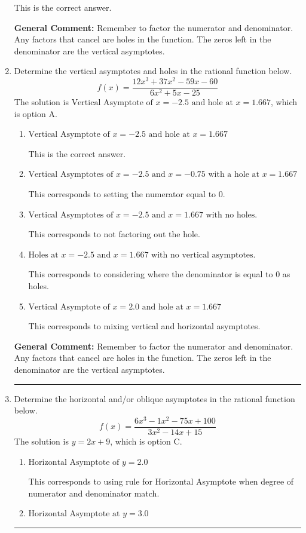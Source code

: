 \documentclass{extbook}[14pt]
\newcommand{\litem}[1]{\item #1

\rule{\textwidth}{0.4pt}}
\begin{document}
\begin{enumerate}
{\begin{enumerate}[label=\Alph*.]
This is the correct answer.
\end{enumerate}

\textbf{General Comment:} Remember to factor the numerator and denominator. Any factors that cancel are holes in the function. The zeros left in the denominator are the vertical asymptotes.
}
\litem{
Determine the vertical asymptotes and holes in the rational function below.
\[ f(x) = \frac{12x^{3} +37 x^{2} -59 x -60}{6x^{2} +5 x -25} \]The solution is \( \text{Vertical Asymptote of } x = -2.5 \text{ and hole at } x = 1.667 \), which is option A.\begin{enumerate}[label=\Alph*.]
\item \( \text{Vertical Asymptote of } x = -2.5 \text{ and hole at } x = 1.667 \)

This is the correct answer.
\item \( \text{Vertical Asymptotes of } x = -2.5 \text{ and } x = -0.75 \text{ with a hole at } x = 1.667 \)

This corresponds to setting the numerator equal to 0.
\item \( \text{Vertical Asymptotes of } x = -2.5 \text{ and } x = 1.667 \text{ with no holes.} \)

This corresponds to not factoring out the hole.
\item \( \text{Holes at } x = -2.5 \text{ and } x = 1.667 \text{ with no vertical asymptotes.} \)

This corresponds to considering where the denominator is equal to 0 as holes.
\item \( \text{Vertical Asymptote of } x = 2.0 \text{ and hole at } x = 1.667 \)

This corresponds to mixing vertical and horizontal asymptotes.
\end{enumerate}

\textbf{General Comment:} Remember to factor the numerator and denominator. Any factors that cancel are holes in the function. The zeros left in the denominator are the vertical asymptotes.
}
\litem{
Determine the horizontal and/or oblique asymptotes in the rational function below.
\[ f(x) = \frac{6x^{3} -1 x^{2} -75 x + 100}{3x^{2} -14 x + 15} \]The solution is \( y = 2x + 9 \), which is option C.\begin{enumerate}[label=\Alph*.]
\item \( \text{Horizontal Asymptote of } y = 2.0  \)

This corresponds to using rule for Horizontal Asymptote when degree of numerator and denominator match.
\item \( \text{Horizontal Asymptote at } y = 3.0 \)


\end{enumerate}}
\end{enumerate}
\end{document}
